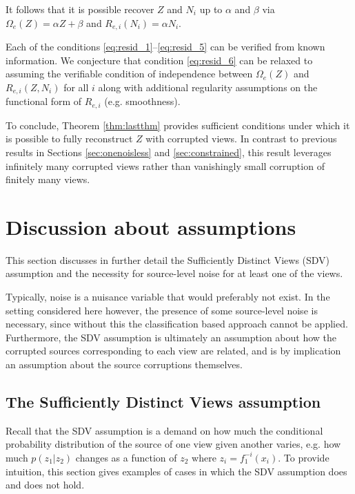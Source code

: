 It follows that it is possible recover $Z$ and $N_i$ up to ${\alpha}$ and ${\beta}$ via $\Omega_e(Z) = {\alpha}Z + {\beta}$ and $R_{{e}, i}(N_i) = {\alpha}N_i$.

Each of the conditions \ref{eq:resid_1}--\ref{eq:resid_5} can be verified from known information.
We conjecture that condition \ref{eq:resid_6} can be relaxed to assuming the verifiable condition of independence between $\Omega_{e}(Z)$ and $R_{e, i}(Z, N_i)$ for all $i$ along with additional regularity assumptions on the functional form of $R_{e, i}$ (e.g. smoothness).

To conclude, Theorem \ref{thm:lastthm} provides sufficient conditions under which it is possible to fully reconstruct $Z$ with corrupted views.
In contrast to previous results in Sections \ref{sec:onenoisless} and \ref{sec:constrained}, this result leverages infinitely many corrupted views rather than vanishingly small corruption of finitely many views.




\section{Discussion about assumptions}\label{sec:ica-assumptions}

This section discusses in further detail the Sufficiently Distinct Views (SDV) assumption and the necessity for source-level noise for at least one of the views.

Typically, noise is a nuisance variable that would preferably not exist.
In the setting considered here however, the presence of some source-level noise is necessary, since without this the classification based approach cannot be applied.
Furthermore, the SDV assumption is ultimately an assumption about how the corrupted sources corresponding to each view are related, and is by implication an assumption about the source corruptions themselves.



\subsection{The Sufficiently Distinct Views assumption}
\label{appendix:sdv}

Recall that the SDV assumption is a demand on how much the conditional probability distribution of the source of one view given another varies, e.g. how much $p(z_1 | z_2)$ changes as a function of $z_2$ where $z_i = f_1^{-i}(x_i)$. 
To provide intuition, this section gives examples of cases in which the SDV assumption does and does not hold.

